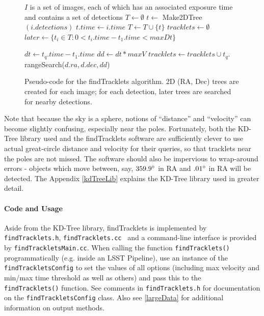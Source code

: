 \begin{figure}[ht]
\begin{algorithmic}
\REQUIRE $I$ is a set of images, each of which has an associated exposure time and contains a set of detections
\STATE {}
\STATE $T \gets \emptyset$
  \STATE $t \gets$ Make2DTree$(i.detections)$
  \STATE $t.time \gets i.time$
  \STATE $T \gets T \cup \{t\}$
\ENDFOR
\STATE {}
\STATE $tracklets \gets \emptyset$
  \STATE $later \gets \{t_i \in T : 0 < t_i.time - t_1.time < maxDt\}$
 
       \STATE {}

        \STATE $dt \gets t_q.time - t_1.time$
        \STATE $dd \gets dt * maxV$
        \STATE {}
        \STATE $tracklets \gets tracklets \cup t_q.$rangeSearch($d.ra, d.dec, dd$)
     \ENDFOR
   \ENDFOR
\ENDFOR
{}
\end{algorithmic}

\caption{Pseudo-code for the findTracklets algorithm.  2D (RA, Dec)
  trees are created for each image; for each detection, later trees
  are searched for nearby detections. }
 \label{findTrackletsAlgorithm}
\end{figure}


Note that because the sky is a sphere, notions of ``distance'' and
``velocity'' can become slightly confusing, especially near the poles.
Fortunately, both the KD-Tree library used and the findTracklets
software are sufficiently clever to use actual great-circle distance
and velocity for their queries, so that tracklets near the poles are
not missed.  The software should also be impervious to wrap-around
errors - objects which move between, say, $359.9 \degree$ in RA and
$.01 \degree$ in RA will be detected.  The Appendix \ref{kdTreeLib}
explains the KD-Tree library used in greater detail.  

\paragraph{Code and Usage}
Aside from the KD-Tree library, findTracklets is implemented by {\tt
  findTracklets.h}, {\tt findTracklets.cc } and a command-line
interface is provided by {\tt findTrackletsMain.cc}.  When calling the
function {\tt findTracklets()} programmatically (e.g. inside an LSST
Pipeline), use an instance of the {\tt findTrackletsConfig} to set the
values of all options (including max velocity and min/max time
threshold as well as others) and pass this to the {\tt
  findTracklets()} function.  See comments in {\tt findTracklets.h}
for documentation on the {\tt findTrackletsConfig} class.  Also see
\ref{largeData} for additional information on output methods.

